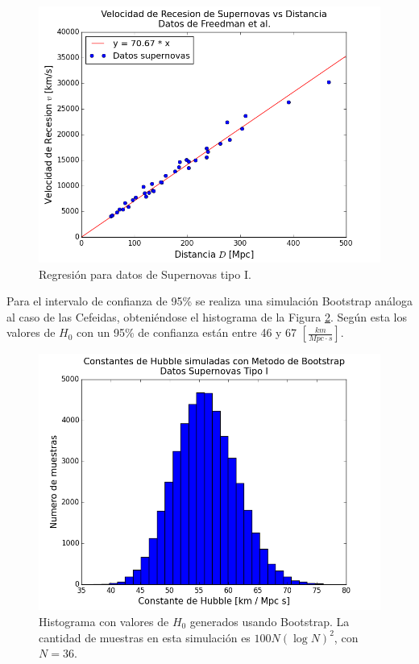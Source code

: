 \documentclass{article}
\begin{document}
\begin{figure}[ht]
  \centering
  \includegraphics[scale = 0.55]{images/regresion_supernovas.png}
  \caption{Regresión para datos de Supernovas tipo I.}
  \label{fig:regresion_supernovas}
\end{figure}

Para el intervalo de confianza de 95\% se realiza una simulación Bootstrap análoga al caso de las Cefeidas, obteniéndose el histograma de la Figura \ref{fig:bootstrap_supernovas}. Según esta los valores de $H_0$ con un 95\% de confianza están entre 46 y 67 $[\frac{km}{Mpc \cdot s}]$.

\begin{figure}[ht]
  \centering
  \includegraphics[scale = 0.55]{images/bootstrap_supernovas.png}
  \caption{Histograma con valores de $H_0$ generados usando Bootstrap. La cantidad de muestras en esta simulación es $100 N (\log{N})^2$, con $N=36$.}
  \label{fig:bootstrap_supernovas}  
\end{figure}
\end{document}
